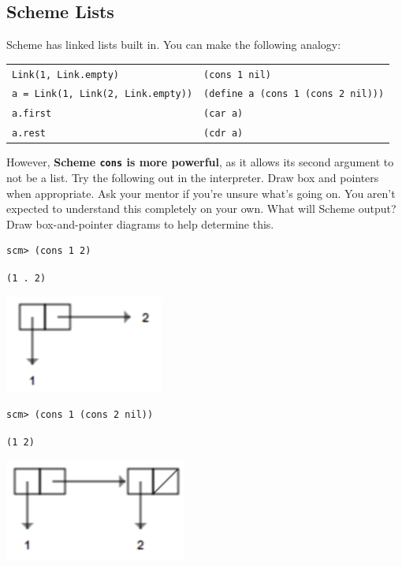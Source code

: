 \documentclass{exam}
\begin{document}
\begin{questions}
\section{Scheme Lists}
\begin{blocksection}
\begin{nonsol}
Scheme has linked lists built in. You can make the following analogy:
\begin{center}
\begin{tabular}{ |l|l| }
\hline
 \texttt{Link(1, Link.empty)} & \texttt{(cons 1 nil)} \\
 \texttt{a = Link(1, Link(2, Link.empty))} & \texttt{(define a (cons 1 (cons 2 nil)))}  \\
 \texttt{a.first} & \texttt{(car a)} \\
 \texttt{a.rest} & \texttt{(cdr a)} \\
 \hline
\end{tabular}
\end{center}
However, \textbf{Scheme \texttt{cons} is more powerful}, as it allows its second argument to not be a list. Try the following out in the interpreter. Draw box and pointers when appropriate. Ask your mentor if you're unsure what's going on. You aren't expected to understand this completely on your own.
\question What will Scheme output? Draw box-and-pointer diagrams to help determine this.
\end{nonsol}

\begin{lstlisting}
scm> (cons 1 2)
\end{lstlisting}
\begin{solution}[0.25in]
\texttt{(1 . 2)}
\begin{center}
\includegraphics[scale=0.7]{9a}
\end{center}
\end{solution}

\begin{lstlisting}
scm> (cons 1 (cons 2 nil))
\end{lstlisting}
\begin{solution}[0.25in]
\texttt{(1 2)}
\begin{center}
\includegraphics[scale=0.7]{9b}
\end{center}
\end{solution}


\end{blocksection}
\end{questions}
\end{document}
